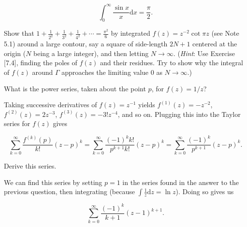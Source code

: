 \documentclass[../the-road-to-reality.tex]{subfiles}
\begin{document}
\begin{questions}
\begin{solution}
	\[
	\int_{0}^{\infty}\frac{\sin{x}}{x}\mathrm{d}x = \frac{\pi}{2}
	.\] 
\end{solution}

\question Show that $1 + \frac{1}{2^2} + \frac{1}{3^2} + \frac{1}{4^2} + \cdots = \frac{\pi^2}{6}$ by integrated $f(z) = z^{-2}\cot\pi{z}$ (see Note 5.1) around a large contour, say a square of side-length $2N + 1$ centered at the origin ($N$ being a large integer), and then letting $N\to\infty$. (\textit{Hint}: Use Exercise [7.4], finding the poles of $f(z)$ and their residues. Try to show why the integral of $f(z)$ around $\Gamma$ approaches the limiting value $0$ as $N\to\infty$.)

\question What is the power series, taken about the point $p$, for $f(z)=1/z$?

\begin{solution}
	Taking successive derivatives of $f(z)=z^{-1}$ yields $f^{(1)}(z)=-z^{-2}$, $f^{(2)}(z)=2z^{-3}$, $f^{(3)}(z)=-3!z^{-4}$, and so on. Plugging this into the Taylor series for $f(z)$ gives

	\[
	\sum_{k=0}^{\infty}\frac{f^{(k)}(p)}{k!}(z-p)^k = \sum_{k=0}^{\infty}\frac{(-1)^kk!}{p^{k+1}k!}(z-p)^k = \sum_{k=0}^{\infty}\frac{(-1)^k}{p^{k+1}}(z-p)^k
	.\] 
\end{solution}

\question Derive this series.

\begin{solution}
	We can find this series by setting $p=1$ in the series found in the answer to the previous question, then integrating (because $\int\frac{1}{z}\mathrm{d}z=\ln{z}$). Doing so gives us

\[
\sum_{k=0}^{\infty}\frac{(-1)^k}{k+1}(z-1)^{k+1}
.\] 
\end{solution}

\end{questions}
	
\end{document}
